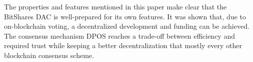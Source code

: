 The properties and features mentioned in this paper make clear that the
BitShares DAC is well-prepared for its own features. It was shown that, due to
on-blockchain voting, a decentralized development and funding can be achieved.
The consensus mechanism DPOS reaches a trade-off between efficiency and
required trust while keeping a better decentralization that mostly every other
blockchain consensus scheme.
